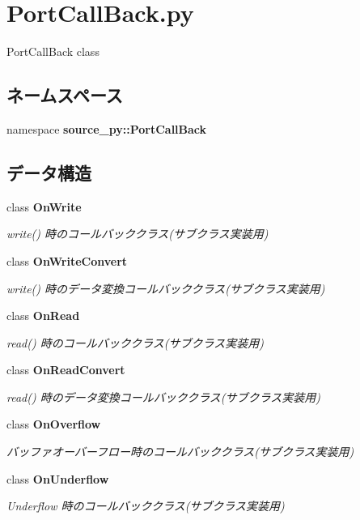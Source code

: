 \section{PortCallBack.py}
\label{_port_call_back_8py}
PortCallBack class 

\subsection*{ネームスペース}
\begin{CompactItemize}
\item 
namespace \textbf{source\_\-py::PortCallBack}
\end{CompactItemize}
\subsection*{データ構造}
\begin{CompactItemize}
\item 
class {\bf OnWrite}
\begin{CompactList}\small\item\em write() 時のコールバッククラス(サブクラス実装用) \item\end{CompactList}\item 
class {\bf OnWriteConvert}
\begin{CompactList}\small\item\em write() 時のデータ変換コールバッククラス(サブクラス実装用) \item\end{CompactList}\item 
class {\bf OnRead}
\begin{CompactList}\small\item\em read() 時のコールバッククラス(サブクラス実装用) \item\end{CompactList}\item 
class {\bf OnReadConvert}
\begin{CompactList}\small\item\em read() 時のデータ変換コールバッククラス(サブクラス実装用) \item\end{CompactList}\item 
class {\bf OnOverflow}
\begin{CompactList}\small\item\em バッファオーバーフロー時のコールバッククラス(サブクラス実装用) \item\end{CompactList}\item 
class {\bf OnUnderflow}
\begin{CompactList}\small\item\em Underflow 時のコールバッククラス(サブクラス実装用) \item\end{CompactList}\end{CompactItemize}


